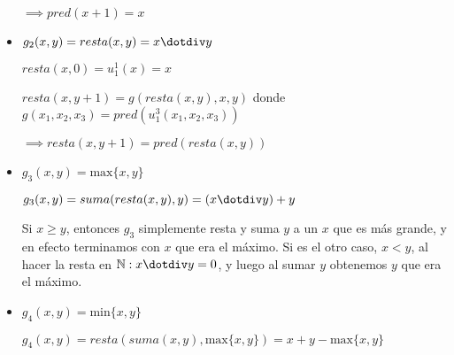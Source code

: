 \begin{itemize}
    $\implies pred(x + 1) = x$

    \item
    $g_2(x, y) = resta(x, y) = x \dotdiv y$

    $resta(x, 0) = u^1_1(x) = x$

    $resta(x, y + 1) = g(resta(x, y), x, y)$ donde $g(x_1, x_2, x_3) = pred(u^3_1(x_1, x_2, x_3))$

    $\implies resta(x, y + 1) = pred(resta(x, y))$

    \item
    $g_3(x, y) = \text{max}\{x, y\}$

    $g_3(x, y) = suma(resta(x, y), y) = (x \dotdiv y) + y$

    Si $x \geq y$, entonces $g_3$ simplemente resta y suma $y$ a un $x$ que es más grande, y en efecto terminamos con $x$ que era el máximo. Si es el otro caso, $x < y$, al hacer la resta en $\mathbb{N}: x \dotdiv y = 0$, y luego al sumar $y$ obtenemos $y$ que era el máximo.

    \item
    $g_4(x, y) = \text{min}\{x, y\}$

    $g_4(x, y) = resta(suma(x, y), \text{max}\{x, y\}) = x + y - \text{max}\{x, y\}$
\end{itemize}
